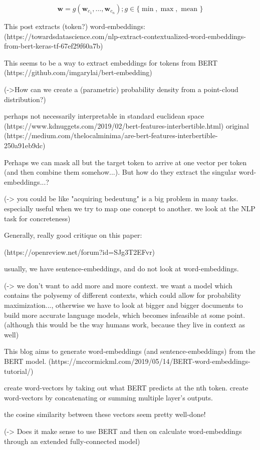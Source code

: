 \documentclass[a4paper,12pt,twoside,openright]{report}
\begin{document}
$$
\mathbf{w}=g\left(\mathbf{w}_{c_{1}}, \dots, \mathbf{w}_{c_{n}}\right) ; g \in\{\min , \max , \text { mean }\}
$$


This post extracts (token?) word-embeddings: 
(https://towardsdatascience.com/nlp-extract-contextualized-word-embeddings-from-bert-keras-tf-67ef29f60a7b)

This seems to be a way to extract embeddings for tokens from BERT
(https://github.com/imgarylai/bert-embedding)

(->How can we create a (parametric) probability density from a point-cloud distribution?)

perhaps not necessarily interpretable in standard euclidean space
(https://www.kdnuggets.com/2019/02/bert-features-interbertible.html)
original (https://medium.com/thelocalminima/are-bert-features-interbertible-250a91eb9dc)

Perhaps we can mask all but the target token to arrive at one vector per token (and then combine them somehow...).
But how do they extract the singular word-embeddings...?

(-> you could be like "acquiring bedeutung" is a big problem in many tasks. especially useful when we try to map one concept to another. we look at the NLP task for concreteness)

Generally, really good critique on this paper:

(https://openreview.net/forum?id=SJg3T2EFvr)

usually, we have sentence-embeddings, and do not look at word-embeddings.

(-> we don't want to add more and more context. we want a model which contains the polysemy of different contexts, which could allow for probability maximization..., otherwise we have to look at bigger and bigger documents to build more accurate language models, which becomes infeasible at some point. (although this would be the way humans work, because they live in context as well)

This blog aims to generate word-embeddings (and sentence-embeddings) from the BERT model.
(https://mccormickml.com/2019/05/14/BERT-word-embeddings-tutorial/)

create word-vectors by taking out what BERT predicts at the nth token.
create word-vectors by concatenating or summing multiple layer's outputs.

the cosine similarity between these vectors seem pretty well-done!


(-> Does it make sense to use BERT and then on calculate word-embeddings through an extended fully-connected model)
\end{document}
